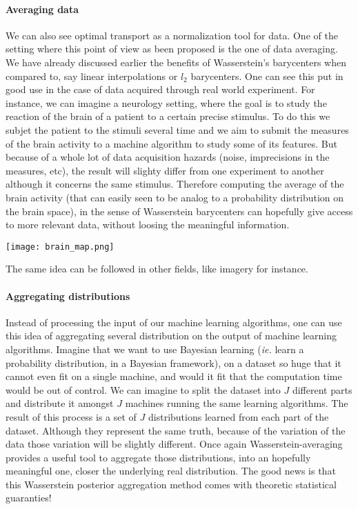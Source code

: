 \paragraph{Averaging data}

We can also see optimal transport as a normalization tool for data. One of
the setting where this point of view as been proposed is the one of data
averaging. We have already discussed earlier the benefits of Wasserstein's
barycenters when compared to, say linear interpolations or $l_2$
barycenters. One can see this put in good use in the case of data acquired
through real world experiment. For instance, we can imagine a neurology
setting, where the goal is to study the reaction of the brain of a patient
to a certain precise stimulus. To do this we subjet the patient to the stimuli
several time and we aim to submit the measures of the brain activity to
a machine algorithm to study some of its features. But because of a whole
lot of data acquisition hazards (noise, imprecisions in the measures, etc),
the result will slighty differ from one experiment to another although it
concerns the same stimulus. Therefore computing the average of the brain
activity (that can easily seen to be analog to a probability distribution
on the brain space), in the sense of Wasserstein barycenters can hopefully
give access to more relevant data, without loosing the meaningful information.


\begin{center}
    \centering
	\texttt{[image: brain\_map.png]}
\end{center}

The same idea can be followed in other fields, like imagery for instance.

\paragraph{Aggregating distributions}

Instead of processing the input of our machine learning algorithms, one can
use this idea of aggregating several distribution on the output of machine
learning algorithms. Imagine that we want to use Bayesian learning (\emph{ie.}
learn a probability distribution, in a Bayesian framework), on a dataset so
huge that it cannot even fit on a single machine, and would it fit that the
computation time would be out of control. We can imagine to split the dataset
into $J$ different parts and distribute it amongst $J$ machines running the
same learning algorithms. The result of this process is a set of $J$
distributions learned from each part of the dataset. Although they represent
the same truth, because of the variation of the data those variation will
be slightly different. Once again Wasserstein-averaging provides a useful
tool to aggregate those distributions, into an hopefully meaningful one,
closer the underlying real distribution. The good news is that this Wasserstein
posterior aggregation method comes with theoretic statistical guaranties!

